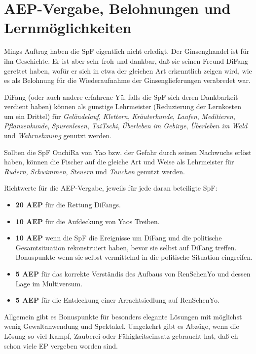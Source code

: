 \documentclass[
a4paper,
twoside,
DIV=calc,
BCOR=4mm,
fontsize=9pt,
twocolumn=on,
titlepage=on,
parskip=half
]{scrartcl}
\begin{document}
\section{AEP-Vergabe, Belohnungen und Lernmöglichkeiten}

Mings Auftrag haben die SpF eigentlich nicht erledigt. Der
Ginsenghandel ist für ihn Geschichte. Er ist aber sehr froh und
dankbar, daß sie seinen Freund DiFang gerettet haben, wofür er sich in
etwa der gleichen Art erkenntlich zeigen wird, wie es als Belohnung
für die Wiederaufnahme der Ginsenglieferungen verabredet war.

DiFang (oder auch andere erfahrene Yü, falls die SpF sich deren
Dankbarkeit verdient haben) können als günstige Lehrmeister
(Reduzierung der Lernkosten um ein Drittel) für \emph{Geländelauf},
\emph{Klettern}, \emph{Kräuterkunde}, \emph{Laufen},
\emph{Meditieren}, \emph{Pflanzenkunde}, \emph{Spurenlesen},
\emph{TaiTschi}, \emph{Überleben im Gebirge}, \emph{Überleben im Wald}
und \emph{Wahrnehmung} genutzt werden.

Sollten die SpF OnchiRa von Yao bzw. der Gefahr durch seinen Nachwuchs
erlöst haben, können die Fischer auf die gleiche Art und Weise als
Lehrmeister für \emph{Rudern}, \emph{Schwimmen}, \emph{Steuern} und
\emph{Tauchen} genutzt werden.

Richtwerte für die AEP-Vergabe, jeweils für jede daran beteiligte SpF:
\begin{itemize}
\item \textbf{20 AEP} für die Rettung DiFangs.
\item \textbf{10 AEP} für die Aufdeckung von Yaos Treiben.
\item \textbf{10 AEP} wenn die SpF die Ereignisse um DiFang und die
  politische Gesamtsituation rekonstruiert haben, bevor sie selbst auf
  DiFang treffen. Bonuspunkte wenn sie selbst vermittelnd in die
  politische Situation eingreifen.
\item \textbf{5 AEP} für das korrekte Verständis des Aufbaus von
  RenSchenYo und dessen Lage im Multiversum.
\item \textbf{5 AEP} für die Entdeckung einer Arrachtsiedlung auf
  RenSchenYo.
\end{itemize}

Allgemein gibt es Bonuspunkte für besonders elegante Lösungen mit
möglichst wenig Gewaltanwendung und Spektakel. Umgekehrt gibt es
Abzüge, wenn die Lösung so viel Kampf, Zauberei oder Fähigkeitseinsatz
gebraucht hat, daß eh schon viele EP vergeben worden sind.
\end{document}
